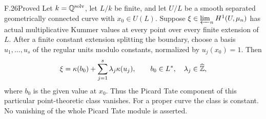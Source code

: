 \begin{claim}{F.26}{Proved}
Let $k=\mathbb Q^{\mathrm{solv}}$, let $L/k$ be finite, and let
$U/L$ be a smooth separated geometrically connected curve with
$x_0\in U(L)$. Suppose
$\xi\in\varprojlim_n H^1(U,\mu_n)$ has actual multiplicative
Kummer values at every point over every finite extension of $L$.
After a finite constant extension splitting the boundary, choose
a basis $u_1,\ldots,u_s$ of the regular units modulo constants,
normalized by $u_j(x_0)=1$. Then
\[
 \xi=\kappa(b_0)+\sum_{j=1}^s\lambda_j\kappa(u_j),
 \qquad b_0\in L^*,\quad\lambda_j\in\widehat{\mathbb Z},
\]
where $b_0$ is the given value at $x_0$. Thus the Picard Tate
component of this particular point-theoretic class vanishes.
For a proper curve the class is constant. No vanishing of the
whole Picard Tate module is asserted.
\end{claim}
